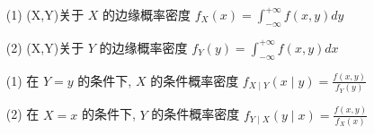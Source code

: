 \documentclass[12pt, a4paper, oneside, UTF8]{ctexbook}
\begin{document}
\begin{remark}[边缘概率密度]
    \begin{enumerate}
    \item[(1)](X,Y)关于 $X$ 的边缘概率密度 ${f}_{X}\left( x\right)  = {\int }_{-\infty }^{+\infty }f\left( {x,y}\right) {dy}$
    \item[(2)](X,Y)关于 $Y$ 的边缘概率密度 ${f}_{Y}\left( y\right)  = {\int }_{-\infty }^{+\infty }f\left( {x,y}\right) {dx}$
    \end{enumerate}
\end{remark}
\begin{remark}[条件概率密度]
\begin{enumerate}
    \item[(1)]在 $Y = y$ 的条件下, $X$ 的条件概率密度 ${f}_{X \mid  Y}\left( {x \mid  y}\right)  = \frac{f\left( {x,y}\right) }{{f}_{Y}\left( y\right) }$
    \item[(2)]在 $X = x$ 的条件下, $Y$ 的条件概率密度 ${f}_{Y \mid  X}\left( {y \mid  x}\right)  = \frac{f\left( {x,y}\right) }{{f}_{X}\left( x\right) }$
\end{enumerate}
\end{remark}
\end{document}
